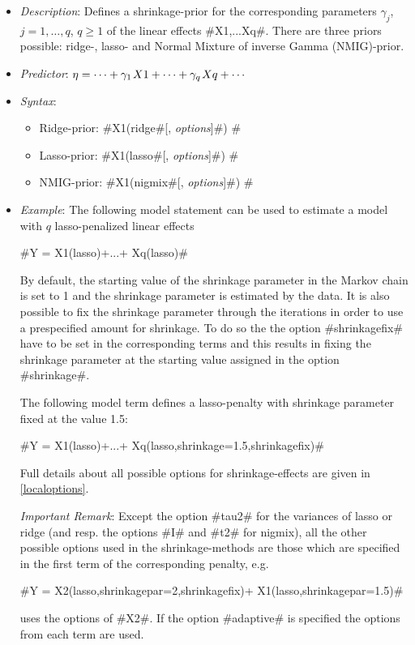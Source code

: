 \begin{itemize}
\item[] {\em Description}: Defines a shrinkage-prior for the corresponding
  parameters $\gamma _{j} $, $j=1,\ldots,q$, $q \ge 1$ of the linear effects
  #X1,...Xq#. There are three priors possible: ridge-,
  lasso- and Normal Mixture of inverse Gamma (NMIG)-prior.

\item[] {\em Predictor}: $\eta =\cdots +\gamma _{1} {\kern 1pt} X1+\cdots +
  \gamma _{q} {\kern 1pt} Xq+\cdots $

\item[] {\em Syntax}:

  \begin{itemize}
  \item  Ridge-prior: #X1(ridge#[, {\em options}]#) #
  \item  Lasso-prior: #X1(lasso#[, {\em options}]#) #
  \item  NMIG-prior: #X1(nigmix#[, {\em options}]#) #
  \end{itemize}

\item[] {\em Example}:
 The following model statement can be used to estimate a model with $q$ lasso-penalized
 linear effects

 #Y = X1(lasso)+...+ Xq(lasso)#

 By default, the starting value of the shrinkage parameter in the Markov chain is
 set to 1 and the shrinkage parameter is estimated by the data. It is also possible
 to fix the shrinkage parameter through the iterations in order to use a prespecified
 amount for shrinkage. To do so the the option #shrinkagefix# have to be set
 in the corresponding terms and this results in fixing the shrinkage parameter at
 the starting value assigned in the option #shrinkage#.

 The following model term defines a lasso-penalty with shrinkage parameter
 fixed at the value 1.5:

 #Y = X1(lasso)+...+ Xq(lasso,shrinkage=1.5,shrinkagefix)#

 Full details about all possible options for shrinkage-effects are given in \ref{localoptions}.

 {\em Important Remark}: Except the option #tau2# for the variances of lasso or ridge
 (and resp. the options #I# and #t2# for nigmix),
 all the other possible options used in the shrinkage-methods are those which are
 specified in the first term of the corresponding penalty, e.g.

 #Y = X2(lasso,shrinkagepar=2,shrinkagefix)+ X1(lasso,shrinkagepar=1.5)#

 uses the options of #X2#. If the option #adaptive# is specified the options from
 each term are used.

\end{itemize}

